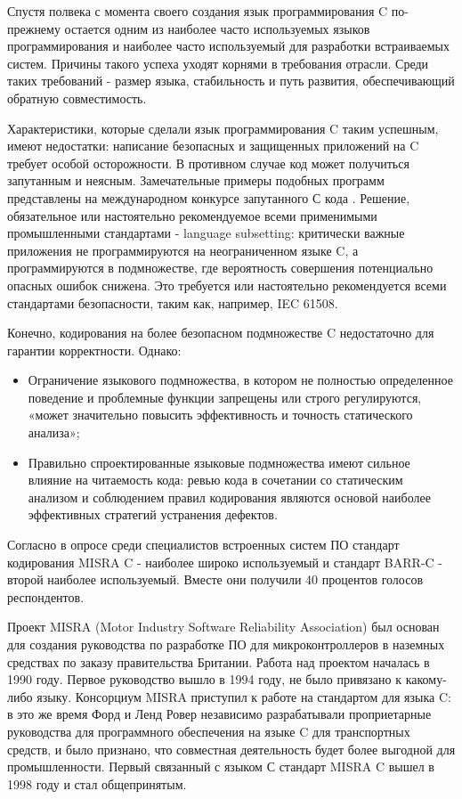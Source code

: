 Спустя полвека с момента своего создания язык программирования C по-прежнему остается одним из наиболее часто 
используемых языков программирования\autocite{TiobeIndex} и наиболее часто используемый для разработки 
встраиваемых систем. Причины такого успеха уходят корнями в требования отрасли. Среди таких требований - размер 
языка, стабильность и путь развития, обеспечивающий обратную совместимость.

Характеристики, которые сделали язык программирования C таким успешным, имеют недостатки: написание безопасных 
и защищенных приложений на C требует особой осторожности. В противном случае код может получиться 
запутанным и неясным. Замечательные примеры подобных программ представлены на международном конкурсе 
запутанного С кода \autocite{ioccc}. Решение, обязательное или настоятельно рекомендуемое 
всеми применимыми промышленными стандартами - language subsetting: критически важные приложения не 
программируются на неограниченном языке C, а программируются в подмножестве, где вероятность совершения 
потенциально опасных ошибок снижена. Это требуется или настоятельно рекомендуется всеми стандартами 
безопасности, таким как, например, IEC 61508\autocite{IEC61508}.

Конечно, кодирования на более безопасном подмножестве C недостаточно для гарантии корректности. Однако:

\begin{itemize}
    \item Ограничение языкового подмножества, в котором не полностью определенное поведение и 
    проблемные функции запрещены или строго регулируются, «может значительно повысить эффективность и  
    точность статического анализа»\autocite{astreeConf};
    \item Правильно спроектированные языковые подмножества имеют сильное влияние на читаемость кода:
    ревью кода в сочетании со статическим анализом и соблюдением правил кодирования являются основой 
    наиболее эффективных стратегий устранения дефектов.  
\end{itemize}

Согласно\autocite{bagnara2020barrc2018} в опросе среди специалистов встроенных систем ПО  стандарт кодирования MISRA C\autocite{Misrac1998} - наиболее широко 
используемый и стандарт BARR-C\autocite{barrc} - второй наиболее используемый. Вместе они получили 40 процентов голосов респондентов.  

Проект MISRA (Motor Industry Software Reliability Association) был основан для создания руководства по разработке ПО для микроконтроллеров в 
наземных средствах по заказу правительства Британии. Работа над проектом началась в 1990 году.  Первое руководство вышло в 1994 году, не 
было привязано к какому-либо языку. Консорциум MISRA приступил к работе на стандартом для языка C: в это же время Форд и Ленд Ровер независимо разрабатывали проприетарные 
руководства для программного обеспечения на языке C для транспортных средств, и было признано, что совместная 
деятельность будет более выгодной для промышленности. Первый связанный с языком С стандарт MISRA C\autocite{Misrac1998} вышел в 1998 году и стал общепринятым. 

